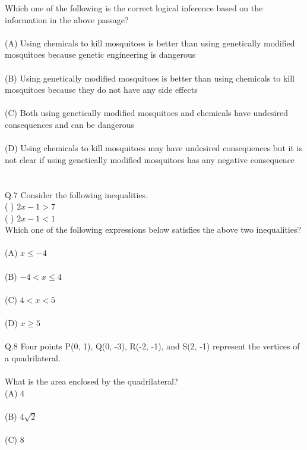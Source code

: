 \documentclass{book}[200pt]
\begin{document}
{	 Which one of the following is the correct logical inference based on the
	 information in the above passage?\\
	 \\
	 (A) Using chemicals to kill mosquitoes is better than using genetically modified
	 mosquitoes because genetic engineering is dangerous\\
	 \\
	 (B) Using genetically modified mosquitoes is better than using chemicals to kill
	 mosquitoes because they do not have any side effects\\
	 \\
	 (C) Both using genetically modified mosquitoes and chemicals have undesired
	 consequences and can be dangerous\\
	 \\
	 (D) Using chemicals to kill mosquitoes may have undesired consequences but it is
	 not clear if using genetically modified mosquitoes has any negative
	 consequence\\
	 \\
	 \\
	 Q.7 Consider the following inequalities.\\
	   ( )      $ 2x - 1 > 7 $ \\
	   ( )    $ 2x - 1 < 1 $  \\
	   Which one of the following expressions below satisfies the above two
	   inequalities?\\
	   \\
	   (A) $ x \leq -4$\\
	   \\
	   (B) $-4 < x \leq 4 $\\
\\
	   (C) $4 < x < 5$\\
\\
	   (D) $x \geq 5 $\\
	   \\
	   Q.8 Four points P(0, 1), Q(0, -3), R(-2, -1), and S(2, -1) represent the vertices
	   of a quadrilateral.\\
	   \\
	   What is the area enclosed by the quadrilateral?\\
	   (A) 4\\
	   \\
	   (B) $4\sqrt{2}$ \\
	   \\
	   (C) 8\\
	   \\
}
\end{document}

